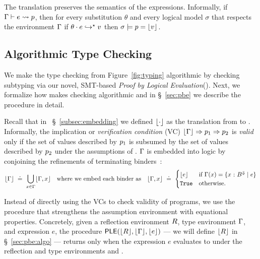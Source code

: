%
The translation preserves the semantics of the expressions.
%
Informally,
if ${ \Gamma\vdash e \rightsquigarrow p }$,
then for every substitution $\theta$ and every logical model $\sigma$
that respects the environment $\Gamma$
if ${{\theta} \cdot {\ensuremath{e}} }\hookrightarrow^{\star}{v}$
then $\sigma \models p = \lfloor v\rfloor $.
%
%

\subsection{Algorithmic Type Checking}\label{sec:pbe:tc}

We make the type checking from Figure~\ref{fig:typing}
algorithmic by checking subtyping via our novel,
SMT-based \emph{Proof by Logical Evaluation}(\pbesym).
Next, we formalize how \pbesym makes checking algorithmic
and in \S~\ref{sec:pbe} we describe the \pbesym procedure in detail.

%
Recall that in ~\S~\ref{subsec:embedding} we defined
$\lfloor \cdot\rfloor $ as the translation from \corelan
to \smtlan.
%
Informally, the implication or \emph{verification condition} (VC)
$\tosmt{\env} \Rightarrow {\pred_1} \Rightarrow {\pred_2}$ is \emph{valid} only if the
set of values described by $p_1$ is subsumed by
the set of values described by $p_2$ under the
assumptions of \env.
%
$\Gamma$ is embedded into logic by conjoining
the refinements of terminating binders~\cite{Vazou14}:
%
$$
\tosmt{\env} \defeq \bigcup_{x \in \env} \tosmt{\env, x} %
\quad \mbox{where we embed each binder as} \quad
\tosmt{\env, x} \defeq \begin{cases}
                           \tosmt{e}  & \text{if } \env(x)=\tref{x}{\btyp^{\tlabel}}{e}\\
                           \etrue & \text{otherwise}.
                         \end{cases}
$$

Instead of directly using the VCs to check validity of programs, we
use the procedure \pbesym that strengthens the assumption environment \tosmt{\env}
with equational properties.
%
Concretely,
%
given a
%
reflection environment $R$,
%
type environment $\Gamma$, and
%
expression $e$,
%
the procedure $\mathsf{PLE}(\lfloor R\rfloor ,\lfloor \Gamma\rfloor ,\lfloor e\rfloor )$
--- we will define $\lfloor R\rfloor $ in \S~\ref{sec:pbe:algo} ---
returns \ttrue only when the expression $e$ evaluates
to \etrue under the reflection and type environments
\RRenv and \env.

